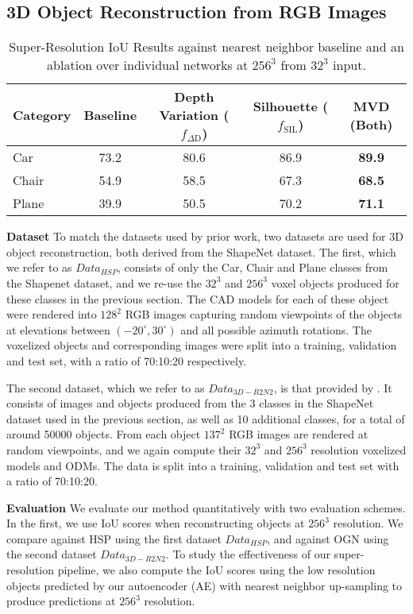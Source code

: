 \documentclass{article}
\begin{document}
\subsection{3D Object Reconstruction from RGB Images}

\begin{table}
  \caption{Super-Resolution IoU Results against nearest neighbor baseline and an ablation over individual networks at $256^3$ from $32^3$ input.} \label{table:SR} 
  \centering
  \begin{tabular}{lcccc}
    \toprule
    Category 	& Baseline & Depth Variation ($f_{\Delta \text{D}}$) & Silhouette ($f_{\text{SIL}}$) & MVD (Both) \\
    \midrule
    Car 		& 73.2 & 80.6 & 86.9 & \bf{89.9} \\
   	Chair 		& 54.9 & 58.5 & 67.3 & \bf{68.5} \\
    Plane 		& 39.9 & 50.5 & 70.2 & \bf{71.1} \\
    \bottomrule
  \end{tabular}
\end{table} 


\textbf{Dataset} \quad To match the datasets used by prior work, two datasets are used for 3D object reconstruction, both derived from the ShapeNet dataset. The first, which we refer to as $Data_{HSP}$, consists of only the Car, Chair and Plane classes from the Shapenet dataset, and we re-use the $32^3$ and $256^3$ voxel objects produced for these classes in the previous section. The CAD models for each of these object were rendered into $128^2$ RGB images capturing random viewpoints of the objects at elevations between $(-20^\circ, 30^\circ)$ and all possible azimuth rotations. The voxelized objects and corresponding images were split into a training, validation and test set, with a ratio of 70:10:20 respectively.

The second dataset, which we refer to as $Data_{3D-R2N2}$, is that provided by \citet{choy20163d}. It consists of images and objects produced from  the 3 classes in the ShapeNet dataset used in the previous section, as well as 10 additional classes, for a total of around 50000 objects. From each object $137^2$ RGB images are rendered at random viewpoints, and we again compute their $32^3$ and $256^3$ resolution voxelized models and ODMs. The data is split into a training, validation and test set with a ratio of 70:10:20. 

\textbf{Evaluation} \quad 
We evaluate our method quantitatively with two evaluation schemes. In the first, we use IoU scores when reconstructing objects at $256^3$ resolution. We compare against HSP \cite{HSP} using the first dataset $Data_{HSP}$, and against OGN \cite{OGN} using the second dataset $Data_{3D-R2N2}$. To study the effectiveness of our super-resolution pipeline, we also compute the IoU scores using the low resolution objects predicted by our autoencoder (AE) with nearest neighbor up-sampling to produce predictions at $256^3$ resolution. 
\end{document}
